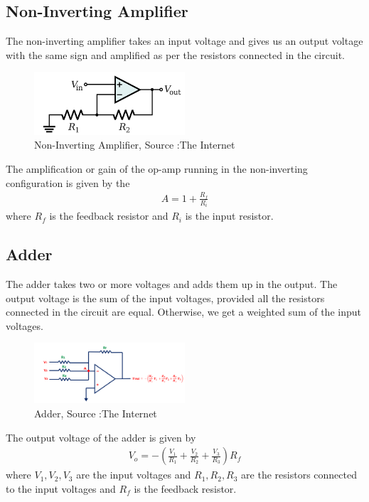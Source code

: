 \documentclass{scrartcl}
\newcommand{\1}{\mathbbm{1}}
\begin{document}
\subsection{Non-Inverting Amplifier}
The non-inverting amplifier takes an input voltage and gives us an output voltage with the same sign and amplified as per the resistors connected in the circuit.
\begin{figure}[H]
    \centering
    \includegraphics[width=0.5\textwidth]{noninv.png}
        \caption{Non-Inverting Amplifier, Source :The Internet}
\end{figure}

The amplification or gain of the op-amp running in the non-inverting configuration is given by the
\begin{align*}
    A = 1 + \frac{R_f}{R_i}
\end{align*}
where $R_f$ is the feedback resistor and $R_i$ is the input resistor.
\subsection{Adder}
The adder takes two or more voltages and adds them up in the output. The output voltage is the sum of the input voltages, provided all the resistors
connected in the circuit are equal. Otherwise, we get a weighted sum of the input voltages.

\begin{figure}[H]
    \centering
    \includegraphics[width=0.5\textwidth]{adder.png}
    \caption{Adder, Source :The Internet}
\end{figure}

The output voltage of the adder is given by
\begin{align*}
    V_o = -\left(\frac{V_1}{R_1} + \frac{V_2}{R_2} + \frac{V_3}{R_3}\right)R_f
\end{align*}
where $V_1, V_2, V_3$ are the input voltages and $R_1, R_2, R_3$ are the resistors connected to the input voltages and $R_f$ is the feedback resistor.
\end{document}
